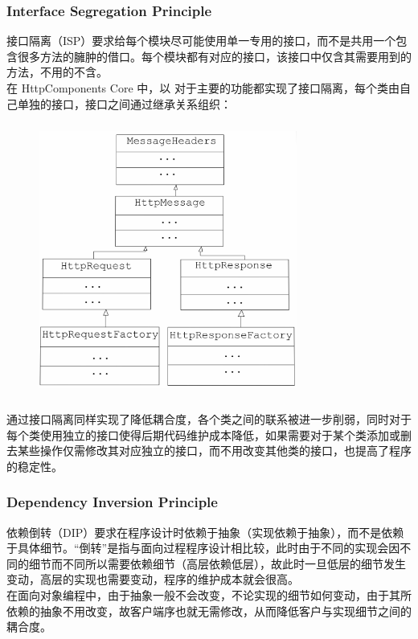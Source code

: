 \documentclass{article}
\begin{document}
	\subsubsection{Interface Segregation Principle}
	\begin{CJK}{UTF8}{gbsn}
		\indent \indent 接口隔离（ISP）要求给每个模块尽可能使用单一专用的接口，而不是共用一个包含很多方法的臃肿的借口。每个模块都有对应的接口，该接口中仅含其需要用到的方法，不用的不含。\\
		\indent 在 HttpComponents Core 中，以 对于主要的功能都实现了接口隔离，每个类由自己单独的接口，接口之间通过继承关系组织：
	\end{CJK}{}
	\begin{figure}[H]
		\centering
		\includegraphics[height = 9cm, width = 8.5cm]{pics/36_Interfaces.jpg}	
	\end{figure}
	\begin{CJK}{UTF8}{gbsn}
		\indent \indent 通过接口隔离同样实现了降低耦合度，各个类之间的联系被进一步削弱，同时对于每个类使用独立的接口使得后期代码维护成本降低，如果需要对于某个类添加或删去某些操作仅需修改其对应独立的接口，而不用改变其他类的接口，也提高了程序的稳定性。
	\end{CJK}{}

	\subsubsection{Dependency Inversion Principle}
	\begin{CJK}{UTF8}{gbsn}
		\indent \indent 依赖倒转（DIP）要求在程序设计时依赖于抽象（实现依赖于抽象），而不是依赖于具体细节。“倒转”是指与面向过程程序设计相比较，此时由于不同的实现会因不同的细节而不同所以需要依赖细节（高层依赖低层），故此时一旦低层的细节发生变动，高层的实现也需要变动，程序的维护成本就会很高。\\
		\indent 在面向对象编程中，由于抽象一般不会改变，不论实现的细节如何变动，由于其所依赖的抽象不用改变，故客户端序也就无需修改，从而降低客户与实现细节之间的耦合度。\\
	\end{CJK}{}
\end{document}
